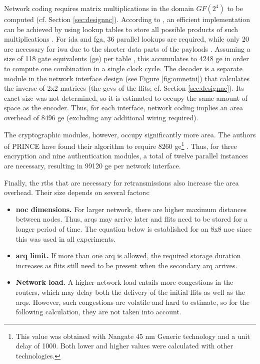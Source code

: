 Network coding requires matrix multiplications in the domain $GF(2^4)$ to be computed (cf. Section \ref{sec:designnc}). According to
\citeauthor{moriam18activeattackers}, an efficient implementation can be achieved by using lookup tables to store all possible products of such
multiplications \cite[6]{moriam18activeattackers}. For \gls{ida} and \gls{fga}, 36 parallel lookups are required, while only 20 are necessary for
\gls{iwa} due to the shorter data parts of the payloads \cite[6]{moriam18activeattackers}. Assuming a size of 118 gate equivalents (\gls{ge}) per
table \cite[6]{moriam18activeattackers}, this accumulates to 4248 \gls{ge} in order to compute one combination in a single clock cycle. The decoder
is a separate module in the network interface design (see Figure \ref{fig:omnetni}) that calculates the inverse of 2x2 matrices (the \glspl{gev} of
the flits; cf. Section \ref{sec:designnc}). Its exact size was not determined, so it is estimated to occupy the same amount of space as the encoder.
Thus, for each interface, network coding implies an area overhead of 8496 \gls{ge} (excluding any additional wiring required).

The cryptographic modules, however, occupy significantly more area. The authors of PRINCE have found their algorithm to require 8260
\gls{ge}\footnote{This value was obtained with Nangate 45 nm Generic technology and a unit delay of 1000. Both lower and higher values were calculated
with other technologies.} \cite[16]{borghoff12prince}. Thus, for three encryption and nine authentication modules, a total of twelve parallel
instances are necessary, resulting in \num{99120} \gls{ge} per network interface.

Finally, the \glspl{rtb} that are necessary for retransmissions also increase the area overhead. Their size depends on several factors:
\begin{itemize}
    \item \textbf{\Gls{noc} dimensions.} For larger network, there are higher maximum distances between nodes. Thus, \glspl{arq} may arrive later and
        flits need to be stored for a longer period of time. The equation below is established for an 8x8 \gls{noc} since this was used in all
        experiments.
    \item \textbf{\Gls{arq} limit.} If more than one \gls{arq} is allowed, the required storage duration increases as flits still need to be present
        when the secondary \gls{arq} arrives.
    \item \textbf{Network load.} A higher network load entails more congestions in the routers, which may delay both the delivery of the initial flits
        as well as the \glspl{arq}. However, such congestions are volatile and hard to estimate, so for the following calculation, they are not taken
        into account.
\end{itemize}
\vspace{\baselineskip}

